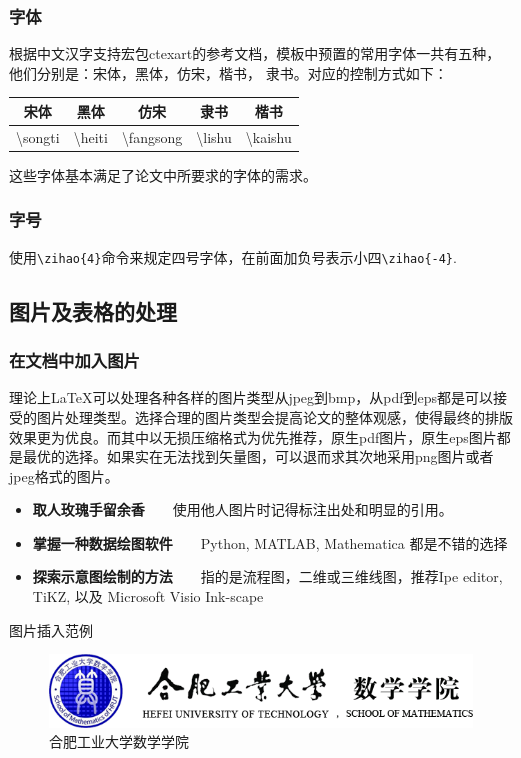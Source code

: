 \subsubsection{字体}
根据中文汉字支持宏包ctexart的参考文档，模板中预置的常用字体一共有五种，他们分别是：宋体，黑体，仿宋，楷书， 隶书。对应的控制方式如下：
\begin{center}
	\begin{tabular}{ccccc}
		\hline \rule[-2ex]{0pt}{5.5ex} { 宋体} & { 黑体} & { 仿宋} & { 隶书} & {楷书} \\ 
		\hline \rule[-2ex]{0pt}{5.5ex} \textbackslash songti &\textbackslash  heiti  & \textbackslash fangsong & \textbackslash lishu & \textbackslash kaishu \\ 
		\hline 
	\end{tabular}  
\end{center}
这些字体基本满足了论文中所要求的字体的需求。


\subsubsection{字号}
使用\verb|\zihao{4}|命令来规定四号字体，在前面加负号表示小四\verb|\zihao{-4}|.
\subsection{图片及表格的处理}

\subsubsection{在文档中加入图片}
理论上\LaTeX 可以处理各种各样的图片类型从jpeg到bmp，从pdf到eps都是可以接受的图片处理类型。选择合理的图片类型会提高论文的整体观感，使得最终的排版效果更为优良。而其中以无损压缩格式为优先推荐，原生pdf图片，原生eps图片都是最优的选择。如果实在无法找到矢量图，可以退而求其次地采用png图片或者jpeg格式的图片。
\begin{itemize}
	\item \textbf{取人玫瑰手留余香}~~~~使用他人图片时记得标注出处和明显的引用。
	\item \textbf{掌握一种数据绘图软件}~~~~Python, MATLAB, Mathematica 都是不错的选择
	\item \textbf{探索示意图绘制的方法}~~~~指的是流程图，二维或三维线图，推荐Ipe editor, TiKZ, 以及 Microsoft Visio Ink-scape
\end{itemize}
图片插入范例
\begin{figure}[!htbp]
	\centering
	\includegraphics[width=0.75\linewidth]{figure/title}
	\caption{合肥工业大学数学学院}
	\label{fig:title}
\end{figure}

